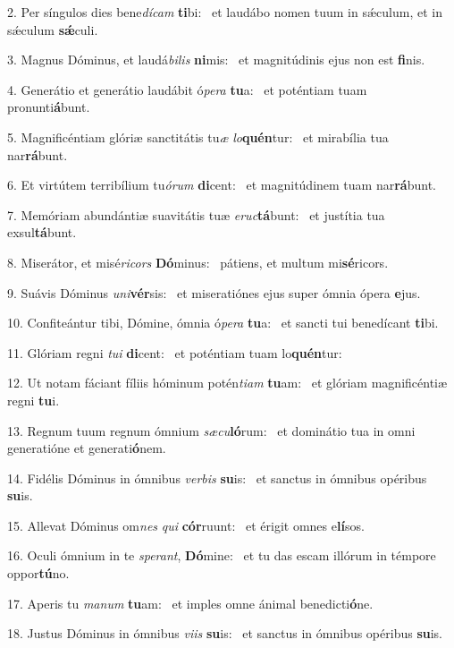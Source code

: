 2. Per síngulos dies bene\textit{dí}\textit{cam} \textbf{ti}bi: \ast\  et laudábo nomen tuum in sǽculum, et in sǽculum \textbf{sǽ}culi.\

3. Magnus Dóminus, et laudá\textit{bi}\textit{lis} \textbf{ni}mis: \ast\  et magnitúdinis ejus non est \textbf{fi}nis.\

4. Generátio et generátio laudábit ó\textit{pe}\textit{ra} \textbf{tu}a: \ast\  et poténtiam tuam pronunti\textbf{á}bunt.\

5. Magnificéntiam glóriæ sanctitátis tu\textit{æ} \textit{lo}\textbf{quén}tur: \ast\  et mirabília tua nar\textbf{rá}bunt.\

6. Et virtútem terribílium tu\textit{ó}\textit{rum} \textbf{di}cent: \ast\  et magnitúdinem tuam nar\textbf{rá}bunt.\

7. Memóriam abundántiæ suavitátis tuæ \textit{e}\textit{ruc}\textbf{tá}bunt: \ast\  et justítia tua exsul\textbf{tá}bunt.\

8. Miserátor, et misé\textit{ri}\textit{cors} \textbf{Dó}minus: \ast\  pátiens, et multum mi\textbf{sé}ricors.\

9. Suávis Dóminus \textit{u}\textit{ni}\textbf{vér}sis: \ast\  et miseratiónes ejus super ómnia ópera \textbf{e}jus.\

10. Confiteántur tibi, Dómine, ómnia ó\textit{pe}\textit{ra} \textbf{tu}a: \ast\  et sancti tui benedícant \textbf{ti}bi.\

11. Glóriam regni \textit{tu}\textit{i} \textbf{di}cent: \ast\  et poténtiam tuam lo\textbf{quén}tur:\

12. Ut notam fáciant fíliis hóminum potén\textit{ti}\textit{am} \textbf{tu}am: \ast\  et glóriam magnificéntiæ regni \textbf{tu}i.\

13. Regnum tuum regnum ómnium \textit{sæ}\textit{cu}\textbf{ló}rum: \ast\  et dominátio tua in omni generatióne et generati\textbf{ó}nem.\

14. Fidélis Dóminus in ómnibus \textit{ver}\textit{bis} \textbf{su}is: \ast\  et sanctus in ómnibus opéribus \textbf{su}is.\

15. Allevat Dóminus om\textit{nes} \textit{qui} \textbf{cór}ruunt: \ast\  et érigit omnes e\textbf{lí}sos.\

16. Oculi ómnium in te \textit{spe}\textit{rant}, \textbf{Dó}mine: \ast\  et tu das escam illórum in témpore oppor\textbf{tú}no.\

17. Aperis tu \textit{ma}\textit{num} \textbf{tu}am: \ast\  et imples omne ánimal benedicti\textbf{ó}ne.\

18. Justus Dóminus in ómnibus \textit{vi}\textit{is} \textbf{su}is: \ast\  et sanctus in ómnibus opéribus \textbf{su}is.\

